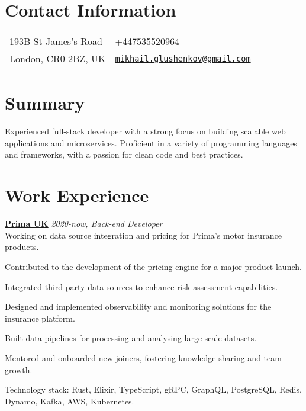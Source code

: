 \documentclass[margin,line]{res}
\begin{document}

\begin{resume}
      \section{\sc Contact Information}
      \vspace{.05in}
      \begin{tabular}{@{}p{2in}p{4in}}
            193B St James's Road &
            +447535520964                           \\
            London, CR0 2BZ, UK  &
            \href{mailto:mikhail.glushenkov@gmail.com}
            {\texttt{mikhail.glushenkov@gmail.com}} \\
      \end{tabular}

      \section{\sc Summary} Experienced full-stack developer with a strong focus
      on building scalable web applications and microservices. Proficient in a
      variety of programming languages and frameworks, with a passion for clean
      code and best practices.

      \section{\sc Work Experience}

       {\bf \href{https://helloprima.co.uk}{Prima UK}} \hfill {\it 2020-now, Back-end Developer}\\
      Working on data source integration and pricing for Prima's motor insurance
      products.\\
      \begin{list}{}{\leftmargin=1.5em}
            \item Contributed to the development of the pricing engine for a major
                  product launch.
            \item Integrated third-party data sources to enhance risk assessment
                  capabilities.
            \item Designed and implemented observability and monitoring
                  solutions for the insurance platform.
            \item Built data pipelines for processing and analysing large-scale
                  datasets.
            \item Mentored and onboarded new joiners, fostering knowledge sharing
                  and team growth.
      \end{list}
      Technology stack: Rust, Elixir, TypeScript, gRPC, GraphQL, PostgreSQL, Redis, Dynamo, Kafka, AWS, Kubernetes.


\end{resume}
\end{document}
